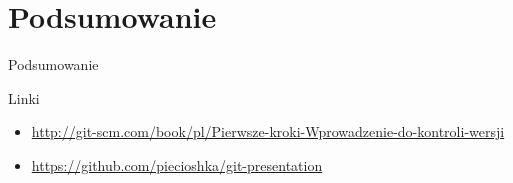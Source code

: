 \documentclass{beamer}
\begin{document}

\section{Podsumowanie}

\begin{frame}{Podsumowanie}
\end{frame}

\begin{frame}{Linki}
\begin{itemize}
  \item \url{http://git-scm.com/book/pl/Pierwsze-kroki-Wprowadzenie-do-kontroli-wersji}
  \item \url{https://github.com/piecioshka/git-presentation}
\end{itemize}
\end{frame}
\end{document}
